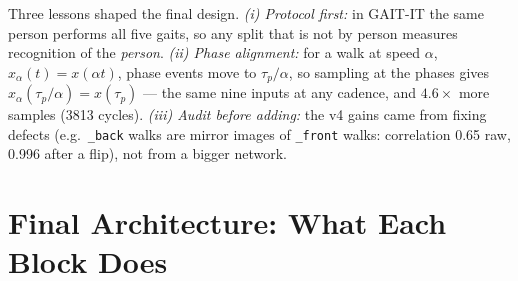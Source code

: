 \documentclass[conference]{IEEEtran}
\begin{document}
Three lessons shaped the final design. \emph{(i) Protocol first:} in GAIT-IT
the same person performs all five gaits, so any split that is not by person
measures recognition of the \emph{person}. \emph{(ii) Phase alignment:} for a
walk at speed $\alpha$, $x_\alpha(t)=x(\alpha t)$, phase events move to
$\tau_p/\alpha$, so sampling at the phases gives
$x_\alpha(\tau_p/\alpha)=x(\tau_p)$ --- the same nine inputs at any cadence,
and $4.6\times$ more samples (3813 cycles). \emph{(iii) Audit before adding:}
the v4 gains came from fixing defects (e.g.\ \texttt{\_back} walks are mirror
images of \texttt{\_front} walks: correlation 0.65 raw, 0.996 after a flip), not
from a bigger network.

\section{Final Architecture: What Each Block Does}\label{sec:arch}
\end{document}
